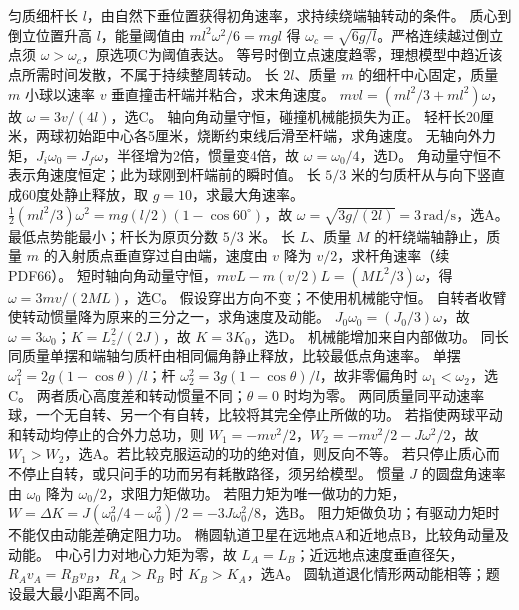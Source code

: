 \problemtext 匀质细杆长 $l$，由自然下垂位置获得初角速率，求持续绕端轴转动的条件。
\workings 质心到倒立位置升高 $l$，能量阈值由 $ml^2\omega^2/6=mgl$ 得 $\omega_c=\sqrt{6g/l}$。严格连续越过倒立点须 $\omega>\omega_c$，原选项C为阈值表达。
\crosscheck 等号时倒立点速度趋零，理想模型中趋近该点所需时间发散，不属于持续整周转动。
\problemtext 长 $2l$、质量 $m$ 的细杆中心固定，质量 $m$ 小球以速率 $v$ 垂直撞击杆端并粘合，求末角速度。
\workings $mvl=(ml^2/3+ml^2)\omega$，故 $\omega=3v/(4l)$，选C。
\crosscheck 轴向角动量守恒，碰撞机械能损失为正。
\problemtext 轻杆长20厘米，两球初始距中心各5厘米，烧断约束线后滑至杆端，求角速度。
\workings 无轴向外力矩，$J_i\omega_0=J_f\omega$，半径增为2倍，惯量变4倍，故 $\omega=\omega_0/4$，选D。
\crosscheck 角动量守恒不表示角速度恒定；此为球刚到杆端前的瞬时值。
\problemtext 长 $5/3$ 米的匀质杆从与向下竖直成60度处静止释放，取 $g=10$，求最大角速率。
\workings $\tfrac12(ml^2/3)\omega^2=mg(l/2)(1-\cos60^\circ)$，故 $\omega=\sqrt{3g/(2l)}=3\,\mathrm{rad/s}$，选A。
\crosscheck 最低点势能最小；杆长为原页分数 $5/3$ 米。
\problemtext 长 $L$、质量 $M$ 的杆绕端轴静止，质量 $m$ 的入射质点垂直穿过自由端，速度由 $v$ 降为 $v/2$，求杆角速率（续PDF66）。
\workings 短时轴向角动量守恒，$mvL-m(v/2)L=(ML^2/3)\omega$，得 $\omega=3mv/(2ML)$，选C。
\crosscheck 假设穿出方向不变；不使用机械能守恒。
\problemtext 自转者收臂使转动惯量降为原来的三分之一，求角速度及动能。
\workings $J_0\omega_0=(J_0/3)\omega$，故 $\omega=3\omega_0$；$K=L_z^2/(2J)$，故 $K=3K_0$，选D。
\crosscheck 机械能增加来自内部做功。
\problemtext 同长同质量单摆和端轴匀质杆由相同偏角静止释放，比较最低点角速率。
\workings 单摆 $\omega_1^2=2g(1-\cos\theta)/l$；杆 $\omega_2^2=3g(1-\cos\theta)/l$，故非零偏角时 $\omega_1<\omega_2$，选C。
\crosscheck 两者质心高度差和转动惯量不同；$\theta=0$ 时均为零。
\problemtext 两同质量同平动速率球，一个无自转、另一个有自转，比较将其完全停止所做的功。
\workings 若指使两球平动和转动均停止的合外力总功，则 $W_1=-mv^2/2$，$W_2=-mv^2/2-J\omega^2/2$，故 $W_1>W_2$，选A。若比较克服运动的功的绝对值，则反向不等。
\crosscheck 若只停止质心而不停止自转，或只问手的功而另有耗散路径，须另给模型。
\problemtext 惯量 $J$ 的圆盘角速率由 $\omega_0$ 降为 $\omega_0/2$，求阻力矩做功。
\workings 若阻力矩为唯一做功的力矩，$W=\Delta K=J(\omega_0^2/4-\omega_0^2)/2=-3J\omega_0^2/8$，选B。
\crosscheck 阻力矩做负功；有驱动力矩时不能仅由动能差确定阻力功。
\problemtext 椭圆轨道卫星在远地点A和近地点B，比较角动量及动能。
\workings 中心引力对地心力矩为零，故 $L_A=L_B$；近远地点速度垂直径矢，$R_Av_A=R_Bv_B$，$R_A>R_B$ 时 $K_B>K_A$，选A。
\crosscheck 圆轨道退化情形两动能相等；题设最大最小距离不同。

